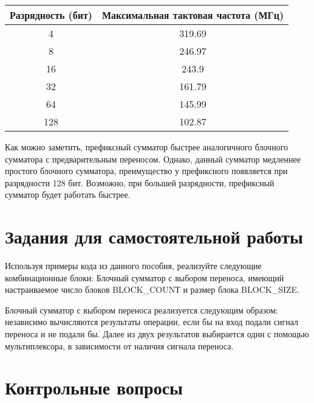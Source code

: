 \documentclass[a4paper,14pt]{article}
\begin{document}
	\begin{table}[H]
		\begin{center}
			\begin{flushleft}
			\end{flushleft}
			\label{tab:task_5}
			\begin{tabular}{|c|c|}
				\hline
				Разрядность (бит)   & Максимальная тактовая частота (МГц)      \\ \hline
				4   & 319.69 \\ \hline
				8   & 246.97 \\ \hline
				16  & 243.9  \\ \hline
				32  & 161.79 \\ \hline
				64  & 145.99 \\ \hline
				128 & 102.87 \\ \hline
			\end{tabular}
		\end{center}
	\end{table}

	Как можно заметить, префиксный сумматор быстрее аналогичного блочного сумматора с предварительным переносом.
	Однако, данный сумматор медленнее простого блочного сумматора, преимущество у префиксного появляется при разрядности 128 бит.
	Возможно, при большей разрядности, префиксный сумматор будет работать быстрее.
	
	\section{Задания для самостоятельной работы}
	
	Используя примеры кода из данного пособия, реализуйте следующие комбинационные
	блоки:
	Блочный сумматор с выбором переноса, имеющий настраиваемое число блоков
	BLOCK\_COUNТ и размер блока BLOCK\_SIZE.
	
	
	Блочный сумматор с выбором переноса реализуется следующим образом:
	независимо вычисляются результаты операции, если бы на вход подали сигнал переноса и не подали бы.
	Далее из двух результатов выбирается один с помощью мультиплексора, в зависимости от наличия сигнала переноса.
	
	
	
	\section{Контрольные вопросы}
	
\end{document}
